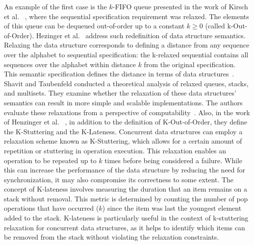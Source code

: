 An example of the first case is the \(k\)-FIFO queue presented in the work of Kirsch et al. ~\cite{DBLP_conf_pact_KirschLP13, DBLP_conf_ica3pp_KirschPRS12}, where the sequential specification requirement was relaxed. The elements of this queue can be dequeued out-of-order up to a constant \(k \ge 0\) (called k-Out-of-Order). Hezinger et al.~\cite{DBLP_conf_popl_HenzingerKPSS13} address such redefinition of data structure semantics. Relaxing the data structure corresponds to defining a distance from any sequence over the alphabet to sequential specification: the k-relaxed sequential contains all sequences over the alphabet within distance \(k\) from the original specification. This semantic specification defines the distance in terms of data structures~\cite{DBLP_conf_popl_HenzingerKPSS13}. Shavit and Taubenfeld conducted a theoretical analysis of relaxed queues, stacks, and multisets. They examine whether the relaxation of these data structures' semantics can result in more simple and scalable implementations. The authors evaluate these relaxations from a perspective of computability~\cite{DBLP_journals_dc_ShavitT16}. Also, in the work of Henzinger et al. ~\cite{DBLP_conf_popl_HenzingerKPSS13}, in addition to the definition of K-Out-of-Order, they define the K-Stuttering and the K-Lateness. Concurrent data structures can employ a relaxation scheme known as K-Stuttering, which allows for a certain amount of repetition or stuttering in operation execution. This relaxation enables an operation to be repeated up to \(k\) times before being considered a failure. While this can increase the performance of the data structure by reducing the need for synchronization, it may also compromise its correctness to some extent. The concept of K-lateness involves measuring the duration that an item remains on a stack without removal. This metric is determined by counting the number of pop operations that have occurred (\(k\)) since the item was last the youngest element added to the stack. K-lateness is particularly useful in the context of k-stuttering relaxation for concurrent data structures, as it helps to identify which items can be removed from the stack without violating the relaxation constraints.

